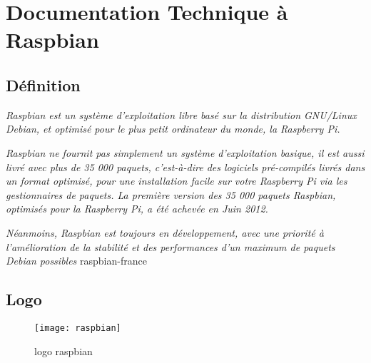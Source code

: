 
\chapter{Documentation Technique à Raspbian}
\label{annexe:raspbian}

\section{Définition}


\textit{\og Raspbian est un système d’exploitation libre basé sur la distribution GNU/Linux Debian, et optimisé pour le plus petit ordinateur du monde, la Raspberry Pi.}

\textit{Raspbian ne fournit pas simplement un système d’exploitation basique, il est aussi livré avec plus de 35 000 paquets, c’est-à-dire des logiciels pré-compilés livrés dans un format optimisé, pour une installation facile sur votre Raspberry Pi via les gestionnaires de paquets.
La première version des 35 000 paquets Raspbian, optimisés pour la Raspberry Pi, a été achevée en Juin 2012.}

\textit{Néanmoins, Raspbian est toujours en développement, avec une priorité à l’amélioration de la stabilité et des performances d’un maximum de paquets Debian possibles\fg{}} raspbian-france\cite{raspbian}

\section{Logo}

\begin{figure}[h]
  \centering
  \texttt{[image: raspbian]}
  \caption{logo raspbian}
  \label{fig:rasp}
\end{figure}







